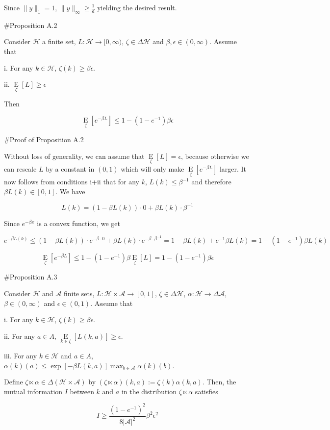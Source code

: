 \documentclass[a4paper]{article}
\newcommand{\E}[1]{\underset{#1}{\operatorname{E}}}
\newcommand{\Abs}[1]{\lvert #1 \rvert}
\newcommand{\Norm}[1]{\lVert #1 \rVert}
\newcommand{\A}{\mathcal{A}}
\newcommand{\Hy}{\mathcal{H}}
\begin{document}
Since $\Norm{y}_1 = 1$, $\Norm{y}_\infty \geq \frac{1}{d}$ yielding the desired result.

\#Proposition A.2

Consider $\Hy$ a finite set, $L: \Hy \rightarrow [0,\infty)$, $\zeta \in \Delta\Hy$ and $\beta,\epsilon \in (0,\infty)$. Assume that

i. For any $k \in \Hy$, $\zeta(k) \geq \beta\epsilon$.

ii. $\E{\zeta}[L] \geq \epsilon$

Then

$$\E{\zeta}[e^{-\beta L}] \leq 1 - (1 - e^{-1})\beta\epsilon$$

\#Proof of Proposition A.2

Without loss of generality, we can assume that $\E\zeta[L] = \epsilon$, because otherwise we can rescale $L$ by a constant in $(0,1)$ which will only make $\E{\zeta}[e^{-\beta L}]$ larger. It now follows from conditions i+ii that for any $k$, $L(k) \leq \beta^{-1}$ and therefore $\beta L(k) \in [0,1]$. We have

$$L(k) = (1 - \beta L(k)) \cdot 0 + \beta L(k) \cdot \beta^{-1}$$

Since $e^{-\beta x}$ is a convex function, we get

$$e^{-\beta L(k)} \leq (1 - \beta L(k)) \cdot e^{-\beta \cdot 0} + \beta L(k) \cdot e^{-\beta \cdot \beta^{-1}} = 1 - \beta L(k) + e^{-1} \beta L(k) = 1-(1-e^{-1})\beta L(k)$$

$$\E\zeta[e^{-\beta L}] \leq 1-(1-e^{-1})\beta \E\zeta[L] = 1-(1-e^{-1})\beta\epsilon$$

\#Proposition A.3

Consider $\Hy$ and $\A$ finite sets, $L: \Hy \times \A \rightarrow [0,1]$, $\zeta \in \Delta\Hy$, $\alpha: \Hy \rightarrow \Delta\A$, $\beta \in (0,\infty)$ and $\epsilon \in (0,1)$. Assume that

i. For any $k \in \Hy$, $\zeta(k) \geq \beta\epsilon$.

ii. For any $a \in A$, $\E{k \in \zeta}[L(k,a)] \geq \epsilon$.

iii. For any $k \in \Hy$ and $a \in A$, $\alpha(k)(a) \leq \exp[-\beta L(k,a)] \max_{b \in \A} \alpha(k)(b)$.

Define $\zeta \ltimes \alpha \in \Delta(\Hy \times \A)$ by $(\zeta \ltimes \alpha)(k,a):=\zeta(k)\alpha(k,a)$. Then,  the mutual information $I$ between $k$ and $a$ in the distribution $\zeta \ltimes \alpha$ satisfies

$$I \geq \frac{(1-e^{-1})^2}{8\Abs{\A}^2} \beta^2 \epsilon^2$$
\end{document}

